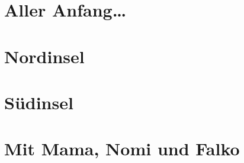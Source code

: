 
\part{Aller Anfang\ldots{}}





\part{Nordinsel}









\part{S\"udinsel}



%



\part{Mit Mama, Nomi und Falko}


